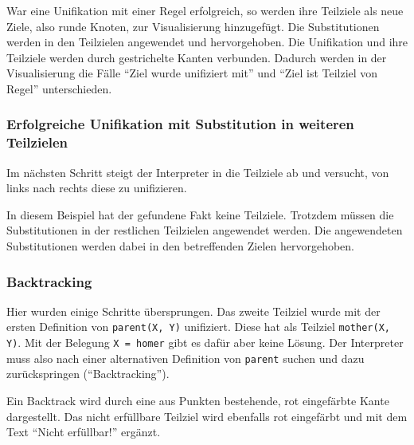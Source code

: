 \documentclass[parskip=full,11pt,twoside]{scrartcl}
\begin{document}
War eine Unifikation mit einer Regel erfolgreich, so werden ihre Teilziele als neue Ziele, also runde Knoten, zur Visualisierung hinzugefügt.
Die Substitutionen werden in den Teilzielen angewendet und hervorgehoben.
Die Unifikation und ihre Teilziele werden durch gestrichelte Kanten verbunden.
Dadurch werden in der Visualisierung die Fälle \enquote{Ziel wurde unifiziert mit} und \enquote{Ziel ist Teilziel von Regel} unterschieden.

\subsubsection{Erfolgreiche Unifikation mit Substitution in weiteren Teilzielen}

Im nächsten Schritt steigt der Interpreter in die Teilziele ab und versucht, von links nach rechts diese zu unifizieren.

\begin{minipage}{\linewidth}
\end{minipage}

In diesem Beispiel hat der gefundene Fakt keine Teilziele.
Trotzdem müssen die Substitutionen in der restlichen Teilzielen angewendet werden.
Die angewendeten Substitutionen werden dabei in den betreffenden Zielen hervorgehoben.

\subsubsection{Backtracking}

Hier wurden einige Schritte übersprungen.
Das zweite Teilziel wurde mit der ersten Definition von \texttt{parent(X, Y)} unifiziert.
Diese hat als Teilziel \texttt{mother(X, Y)}.
Mit der Belegung \texttt{X = homer} gibt es dafür aber keine Lösung.
Der Interpreter muss also nach einer alternativen Definition von \texttt{parent} suchen und dazu zurückspringen (\enquote{Backtracking}).

\begin{minipage}{\linewidth}
\end{minipage}

Ein Backtrack wird durch eine aus Punkten bestehende, rot eingefärbte Kante dargestellt.
Das nicht erfüllbare Teilziel wird ebenfalls rot eingefärbt und mit dem Text \enquote{Nicht erfüllbar!} ergänzt.
\end{document}
